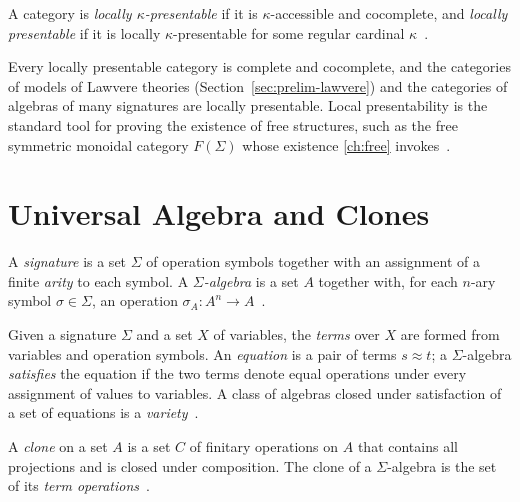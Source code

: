 \begin{definition}
A category is \emph{locally $\kappa$-presentable} if it is
$\kappa$-accessible and cocomplete, and \emph{locally presentable} if it is
locally $\kappa$-presentable for some regular cardinal $\kappa$~\cite{adamek}.
\end{definition}

\begin{remark}
Every locally presentable category is complete and cocomplete, and the
categories of models of Lawvere theories (Section~\ref{sec:prelim-lawvere})
and the categories of algebras of many signatures are locally presentable.
Local presentability is the standard tool for proving the existence of free
structures, such as the free symmetric monoidal category $F (\Sigma)$ whose
existence \autoref{ch:free} invokes~\cite{adamek, lawvere}.
\end{remark}

\section{Universal Algebra and Clones}\label{sec:prelim-univ}

\begin{definition}
A \emph{signature} is a set $\Sigma$ of operation symbols together with an
assignment of a finite \emph{arity} to each symbol. A \emph{$\Sigma$-algebra}
is a set $A$ together with, for each $n$-ary symbol $\sigma \in \Sigma$, an
operation $\sigma_A \colon A^n \to A$~\cite{knuthbendix}.
\end{definition}

\begin{definition}
Given a signature $\Sigma$ and a set $X$ of variables, the \emph{terms} over
$X$ are formed from variables and operation symbols. An \emph{equation} is a
pair of terms $s \approx t$; a $\Sigma$-algebra \emph{satisfies} the equation
if the two terms denote equal operations under every assignment of values to
variables. A class of algebras closed under satisfaction of a set of
equations is a \emph{variety}~\cite{lawvere, knuthbendix}.
\end{definition}

\begin{definition}[Clone]
A \emph{clone} on a set $A$ is a set $C$ of finitary operations on $A$ that
contains all projections and is closed under composition. The clone of a
$\Sigma$-algebra is the set of its \emph{term operations}~\cite{lawvere}.
\end{definition}

